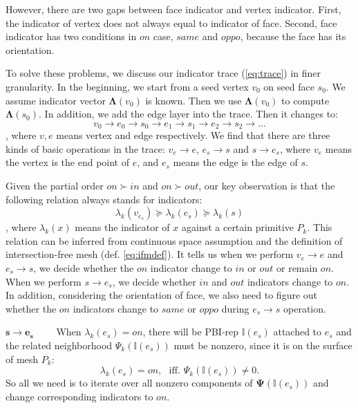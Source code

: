 \documentclass[10pt,journal,compsoc]{IEEEtran}
\begin{document}
However, there are two gaps between face indicator and vertex indicator. First, the indicator of vertex does not always equal to indicator of face. Second, face indicator has two conditions in $on$ case, $same$ and $oppo$, because the face has its orientation.

To solve these problems, we discuss our indicator trace (\ref{eq:trace}) in finer granularity. In the beginning, we start from a seed vertex $v_0$ on seed face $s_0$. We assume indicator vector $\bm{\Lambda}(v_0)$ is known. Then we use $\bm{\Lambda}(v_0)$ to compute $\bm{\Lambda}(s_0)$. In addition, we add the edge layer into the trace. Then it changes to:
\begin{equation}
v_0\to e_0\to s_0\to e_1\to s_1\to e_2\to s_2\to ...
\end{equation}
, where $v, e$ means vertex and edge respectively. We find that there are three kinds of basic operations in the trace: $v_e\to e$, $e_s\to s$ and $s\to e_s$, where $v_e$ means the vertex is the end point of $e$, and $e_s$ means the edge is the edge of $s$.

Given the partial order $on \succ in$ and $on \succ out$, our key observation is that the following relation always stands for indicators:
\begin{equation}
\label{eq:porder}
\lambda_k(v_{e_s}) \succeq \lambda_k(e_s) \succeq \lambda_k(s)
\end{equation}
, where $\lambda_k(x)$ means the indicator of $x$ against a certain primitive $P_k$. This relation can be inferred from continuous space assumption and the definition of intersection-free mesh (def. \ref{eq:ifmdef}). It tells us when we perform $v_e\to e$ and $e_s\to s$, we decide whether the $on$ indicator change to $in$ or $out$ or remain $on$. When we perform $s\to e_s$, we decide whether $in$ and $out$ indicators change to $on$. In addition, considering the orientation of face, we also need to figure out whether the $on$ indicators change to $same$ or $oppo$ during $e_s\to s$ operation.

\vspace{0.5em}
\noindent\textbf{$\bm{s\to e_s}$}~~~~ When $\lambda_k(e_s)=on$, there will be PBI-rep $\mathbb{I}(e_s)$ attached to $e_s$ and the related neighborhood $\Psi_k(\mathbb{I}(e_s))$ must be nonzero, since it is on the surface of mesh $P_k$:
\begin{equation}
\label{eq:eq1}
\lambda_k(e_s)=on,\ \ \  \mbox{iff. }\Psi_k(\mathbb{I}(e_s))\neq 0.
\end{equation}
So all we need is to iterate over all nonzero components of $\bm{\Psi}(\mathbb{I}(e_s))$ and change corresponding indicators to $on$.
\end{document}
